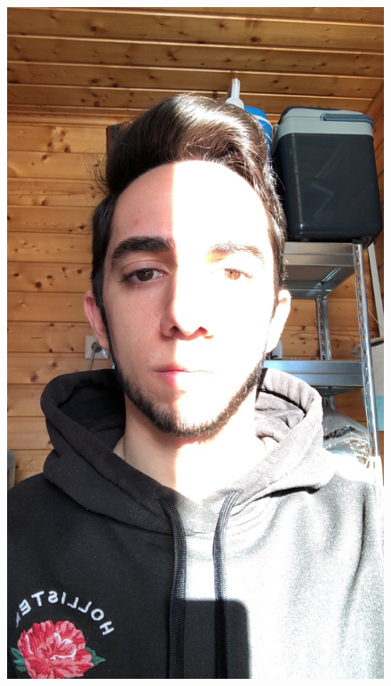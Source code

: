 \begin{figure}[h]
        {\includegraphics[scale = 0.09]{figures/lineup4 - Copy.png}}
    \subfloat[Excellent]

\end{figure}
